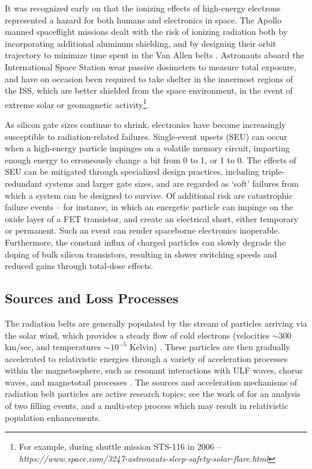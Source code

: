 It was recognized early on that the ionizing effects of high-energy electrons represented a hazard for both humans and electronics in space. The Apollo manned spaceflight missions dealt with the risk of ionizing radiation both by incorporating additional aluminum shielding, and by designing their orbit trajectory to minimize time spent in the Van Allen belts \citep{Apollo1973}. Astronauts aboard the International Space Station wear passive dosimeters to measure total exposure, and have on occasion been required to take shelter in the innermost regions of the ISS, which are better shielded from the space environment, in the event of extreme solar or geomagnetic activity\footnote{For example, during shuttle mission STS-116 in 2006 -- \emph{https://www.space.com/3247-astronauts-sleep-safety-solar-flare.html}}. 

As silicon gate sizes continue to shrink, electronics have become increasingly susceptible to radiation-related failures. Single-event upsets (SEU) can occur when a high-energy particle impinges on a volatile memory circuit, imparting enough energy to erroneously change a bit from 0 to 1, or 1 to 0. The effects of SEU can be mitigated through specialized design practices, including triple-redundant systems and larger gate sizes, and are regarded as `soft' failures from which a system can be designed to survive. Of additional risk are catastrophic failure events -- for instance, in which an energetic particle can impinge on the oxide layer of a FET transistor, and create an electrical short, either temporary or permanent. Such an event can render spaceborne electronics inoperable. Furthermore, the constant influx of charged particles can slowly degrade the doping of bulk silicon transistors, resulting in slower switching speeds and reduced gains through total-dose effects.

\subsection{Sources and Loss Processes}
The radiation belts are generally populated by the stream of particles arriving via the solar wind, which provides a steady flow of cold electrons (velocities $\sim 300$ km/sec, and temperatures $\sim 10^{-5}$ Kelvin) \citep{Montgomery1974, Tascione1988}. These particles are then gradually accelerated to relativistic energies through a variety of acceleration processes within the magnetosphere, such as resonant interactions with ULF waves, chorus waves, and magnetotail processes \citep{Shprits2006,  Bortnik2007a, Thorne2013}. The sources and acceleration mechanisms of radiation belt particles are active research topics; see the work of \cite{Jaynes2015} for an analysis of two filling events, and a multi-step process which may result in relativistic population enhancements.

